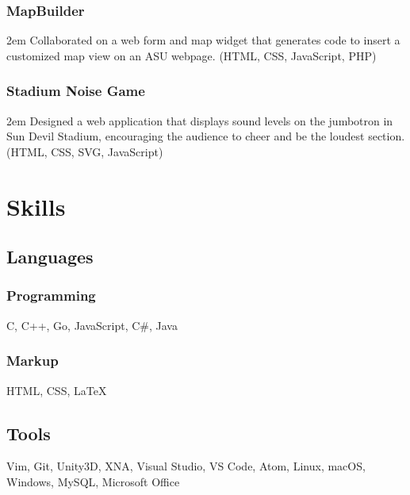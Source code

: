 \documentclass[letterpaper, 10pt]{article}
\begin{document}
\subsubsection{MapBuilder}
\hangindent2em Collaborated on a web form and map widget that generates code to insert a customized map view on an ASU webpage. (HTML, CSS, JavaScript, PHP)

\subsubsection{Stadium Noise Game}
\hangindent2em Designed a web application that displays sound levels on the jumbotron in Sun Devil Stadium, encouraging the audience to cheer and be the loudest section. (HTML, CSS, SVG, JavaScript)

\vspace{-0.5em}

\section{Skills}

\subsection{Languages}
\vspace{-1em}
\begin{multicols}{2}
\subsubsection{Programming}

C, C++, Go, JavaScript, C\#, Java

\subsubsection{Markup}

HTML, CSS, {\LaTeX}
\end{multicols}
\vspace{-0.5em}

\subsection{Tools}

Vim, Git, Unity3D, XNA, Visual Studio, VS Code, Atom, Linux, macOS, Windows, MySQL, Microsoft Office

\vspace{0.5em}
\end{document}
